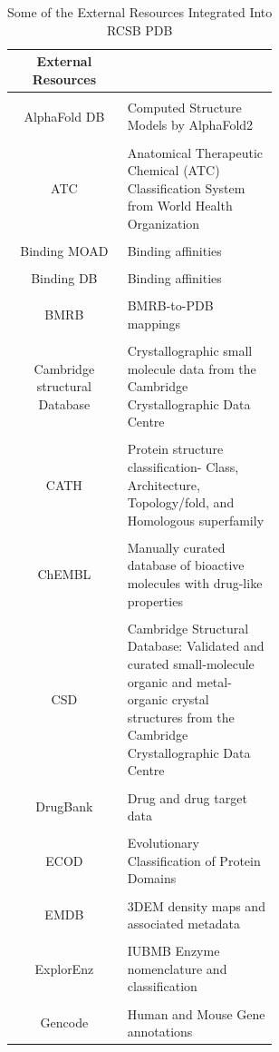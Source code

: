 \documentclass[]{final_report}
\begin{document}
\begin{table}[h!]
    \begin{center}
    \label{tab:External Data}
        \begin{tabular}{c|p{0.58\linewidth}}
        External Resources\\
        \hline
        \\
        AlphaFold DB & Computed Structure Models by AlphaFold2
        \\
        \hline
        \\
        ATC & 	Anatomical Therapeutic Chemical (ATC) Classification System from World Health Organization
        \\
        \hline
        \\
        Binding MOAD & Binding affinities
        \\
        \hline
        \\
        Binding DB & Binding affinities
        \\
        \hline
        \\
        BMRB & BMRB-to-PDB mappings
        \\
        \hline
        \\
        Cambridge structural Database & Crystallographic small molecule data from the Cambridge Crystallographic Data Centre
        \\
        \hline
        \\
        CATH & 	Protein structure classification- Class, Architecture, Topology/fold, and Homologous superfamily    
        \\
        \hline
        \\
        ChEMBL & Manually curated database of bioactive molecules with drug-like properties
        \\
        \hline
        \\
        CSD & Cambridge Structural Database: Validated and curated small-molecule organic and metal-organic crystal structures from the Cambridge Crystallographic Data Centre
        \\
        \hline
        \\
        DrugBank & Drug and drug target data
        \\
        \hline
        \\
        ECOD & Evolutionary Classification of Protein Domains
        \\
        \hline
        \\
        EMDB & 3DEM density maps and associated metadata
        \\
        \hline
        \\
        ExplorEnz & IUBMB Enzyme nomenclature and classification
        \\
        \hline
        \\
        Gencode & Human and Mouse Gene annotations
        \end{tabular}
        \caption{\label{External Data}Some of the External Resources Integrated Into RCSB PDB}
    \end{center}
\end{table}
\end{document}
